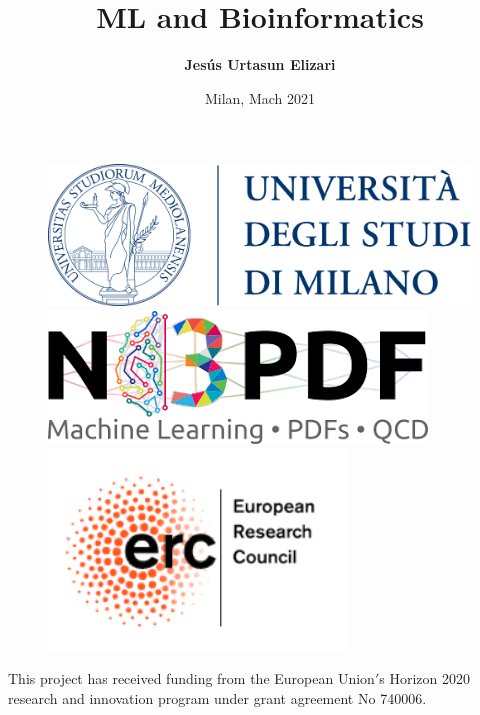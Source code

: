 \documentclass[aspectratio=43]{beamer}
\title[Perturbative QCD predictions for Higgs production]{ML and Bioinformatics}
\author{\textbf {Jes\'us Urtasun Elizari}}
\date{Milan, Mach 2021}
\begin{document}
\begin{frame}

	\vspace{1.0 cm}
	
	
	\vspace{0.25 cm}

	\begin{figure}
		\includegraphics[width = 3.0 cm]{plots/unimi.png}
		\hfill
		\includegraphics[width = 2.5 cm]{plots/n3pdf.png}
		\hfill
		\includegraphics[width = 3.0 cm]{plots/erc.png}
		\endminipage
	\end{figure}

	\vspace{1.0 cm}
	
	{\scriptsize \color{blue} This project has received funding from the European Union$'$s Horizon 2020 research and innovation program under grant agreement No 740006.}

\end{frame}
\end{document}
